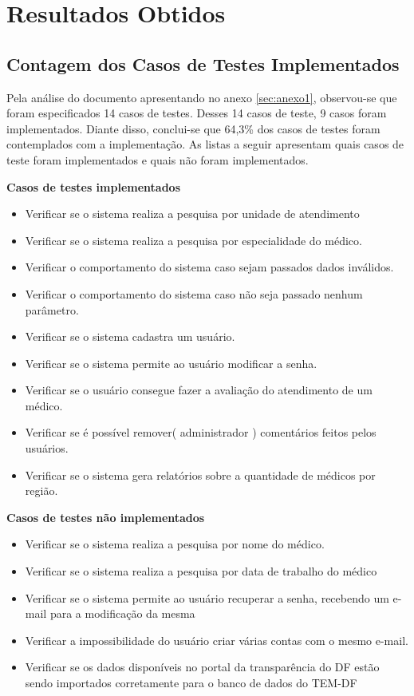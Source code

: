 \chapter[Resultados Obtidos]{Resultados Obtidos}

\section{Contagem dos Casos de Testes Implementados}
\label{sec:contagem-casos}
Pela análise do documento apresentando no anexo \ref{sec:anexo1}, observou-se
que  foram especificados 14 casos de testes. Desses 14 casos de teste, 9 casos
foram implementados. Diante disso, conclui-se que 64,3\% dos casos de testes
foram contemplados com a implementação. As listas a seguir apresentam quais casos
de teste foram implementados e quais não foram implementados.

\textbf{Casos de testes implementados}
\begin{itemize}
	\item Verificar se o sistema realiza a pesquisa por unidade de atendimento
	\item Verificar se o sistema realiza a pesquisa por especialidade do médico.
	\item Verificar o comportamento do sistema caso sejam passados dados inválidos.
	\item Verificar o comportamento do sistema caso não seja passado nenhum parâmetro.
	\item Verificar se o sistema cadastra um usuário.
	\item Verificar se o sistema permite ao usuário modificar a senha.
	\item Verificar se o usuário consegue fazer a avaliação do atendimento de um médico.
	\item Verificar se é possível remover( administrador ) comentários feitos pelos usuários.
	\item Verificar se o sistema gera relatórios sobre a quantidade de médicos por região.
\end{itemize}

\textbf{Casos de testes não implementados}
\begin{itemize}
	\item Verificar se o sistema realiza a pesquisa por nome do médico.
	\item Verificar se o sistema realiza a pesquisa por data de trabalho do médico
	\item Verificar se o sistema permite ao usuário recuperar a senha, recebendo
        um e-mail para a modificação da mesma
	\item Verificar a impossibilidade do usuário criar várias contas com o mesmo
        e-mail.
	\item Verificar se os dados disponíveis no portal da transparência do DF
        estão sendo importados corretamente para o banco de dados do TEM-DF
\end{itemize}

